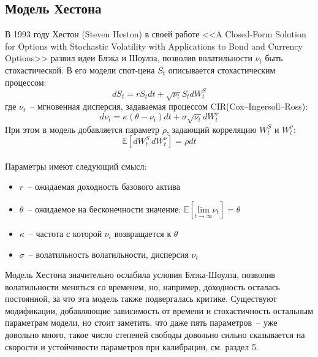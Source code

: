 \documentclass[oneside, final, 12pt]{article}
\begin{document}
\subsection{Модель Хестона}
В 1993 году Хестон (Steven Heston) в своей работе <<A Closed-Form Solution for Options with Stochastic Volatility with Applications to Bond and Currency Options>> развил идеи Блэка и Шоулза, позволив волатильности \(\nu_t\) быть стохастической. В его модели спот-цена $S_t$ описывается стохастическим процессом:
\[dS_t=rS_tdt+\sqrt{\nu_t}S_tdW_t^S\]
где $\nu_t$~-- мгновенная дисперсия, задаваемая процессом CIR(Cox–Ingersoll–Ross):
\[d\nu_t=\kappa(\theta-\nu_t)dt+\sigma\sqrt{\nu_t}dW_t^\nu\]
При этом в модель добавляется параметр $\rho$, задающий корреляцию $W^S_t$ и $W^\nu_t$:
\[\mathbb{E}\left[dW_t^S\, dW_t^\nu\right]=\rho dt\]
\\
Параметры имеют следующий смысл:
\begin{itemize}
\item $r$~-- ожидаемая доходность базового актива
\item $\theta$~-- ожидаемое на бесконечности значение: 
  \( \mathbb{E} \left[\underset{t \rightarrow \infty}{\text{lim}} \nu_t \right] = \theta \)
\item $\kappa$~-- частота с которой $\nu_t$ возвращается к $\theta$ 
\item $\sigma$~-- волатильность волатильности, дисперсия $\nu_t$
\end{itemize}

Модель Хестона значительно ослабила условия Блэка-Шоулза, позволив волатильности меняться со временем, но, например, доходность осталась постоянной, за что эта модель также подвергалась критике. Существуют модификации, добавляющие зависимость от времени и стохастичность остальным параметрам модели, но стоит заметить, что даже пять параметров~-- уже довольно много, такое число степеней свободы довольно сильно сказывается на скорости и устойчивости параметров при калибрации, см. раздел 5.

\newpage
\end{document}
